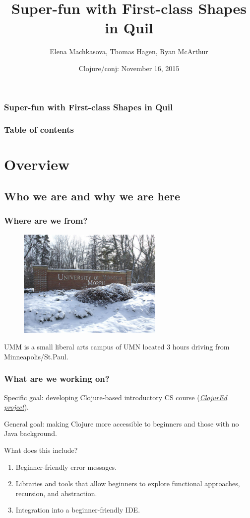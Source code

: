 \documentclass{beamer}
\begin{document}
\author{Elena Machkasova, Thomas Hagen, Ryan McArthur}
\title{Super-fun with First-class Shapes in Quil}
\date{Clojure/conj: November 16, 2015}


\begin{frame}
\frametitle {Super-fun with First-class Shapes in Quil}
\maketitle
\end{frame}

\begin{frame}
\frametitle{Table of contents}
\tableofcontents  
\end{frame}

\section{Overview}

\subsection{Who we are and why we are here}

\begin{frame}
\frametitle{Where are we from?}
\begin{figure}[h]
\includegraphics[width=7cm]{PresentationImages/umm-winter.jpg}
\end{figure}
UMM is a small liberal arts campus of UMN located 3 hours driving from Minneapolis/St.Paul. 
\end{frame}

\begin{frame}
\frametitle{What are we working on?}
Specific goal: developing Clojure-based introductory CS course ({\it \href{http://cda.morris.umn.edu/~elenam/\#clojure}{ClojurEd project}}). 

General goal: making Clojure more accessible to beginners and those with no Java background. 

What does this include? 
\begin{enumerate}
\item Beginner-friendly error messages. 
\item Libraries and tools that allow beginners to explore functional approaches, recursion, and abstraction.
\item Integration into a beginner-friendly IDE. 
\end{enumerate}
\end{frame}
\end{document}
